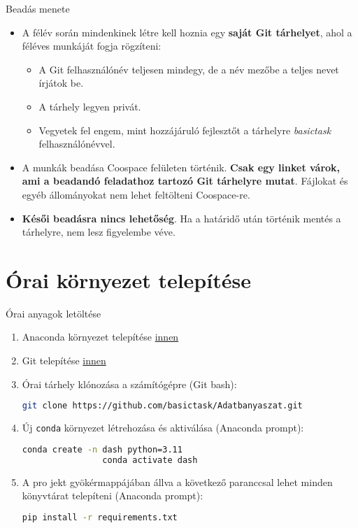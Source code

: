 \documentclass[english, aspectratio=169]{beamer}
\makeatletter
\let\origtableofcontents=\tableofcontents
\def\tableofcontents{\@ifnextchar[{\origtableofcontents}{\gobbletableofcontents}}
\def\gobbletableofcontents#1{\origtableofcontents}
\makeatother
\begin{document}
	\begin{frame}{Beadás menete}
		\begin{itemize}
			\item A félév során mindenkinek létre kell hoznia egy \textbf{saját Git tárhelyet}, ahol a féléves munkáját fogja rögzíteni:
			\begin{itemize}
				\item A Git felhasználónév teljesen mindegy, de a név mezőbe a teljes nevet írjátok be. 
				\item A tárhely legyen privát. 
				\item Vegyetek fel engem, mint hozzájáruló fejlesztőt a tárhelyre \emph{basictask} felhasználónévvel. 
			\end{itemize}
			\item A munkák beadása Coospace felületen történik. \textbf{Csak egy linket várok, ami a beadandó feladathoz tartozó Git tárhelyre mutat}. Fájlokat és egyéb állományokat nem lehet feltölteni Coospace-re.
			\item \textbf{Késői beadásra nincs lehetőség}. Ha a határidő után történik mentés a tárhelyre, nem lesz figyelembe véve.
		\end{itemize}
	\end{frame}
	
	\section{Órai környezet telepítése}
	
	\begin{frame}{}
		\tableofcontents[currentsection]
	\end{frame}
	
	\begin{frame}[fragile]{Órai anyagok letöltése}
		\begin{enumerate}
			\item Anaconda környezet telepítése \href{https://www.anaconda.com/download}{innen}
			\item Git telepítése \href{https://git-scm.com/downloads}{innen}
			\item Órai tárhely klónozása a számítógépre (Git bash):
			\begin{lstlisting}[language=bash]
				git clone https://github.com/basictask/Adatbanyaszat.git
			\end{lstlisting}
			\item Új \texttt{conda} környezet létrehozása és aktiválása (Anaconda prompt):
			\begin{lstlisting}[language=bash]
				conda create -n dash python=3.11
				conda activate dash
			\end{lstlisting}
			\item A pro jekt gyökérmappájában állva a következő paranccsal lehet minden könyvtárat telepíteni (Anaconda prompt):
			\begin{lstlisting}[language=bash]
				pip install -r requirements.txt
			\end{lstlisting}
		\end{enumerate}
	\end{frame}
	
\end{document}

